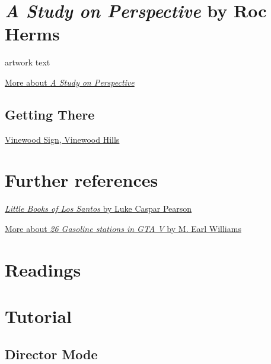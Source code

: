 \documentclass[
  openany]{book}
\begin{document}
\hypertarget{a-study-on-perspective-by-roc-herms}{%
\section*{\texorpdfstring{\emph{A Study on Perspective} by Roc Herms}{A Study on Perspective by Roc Herms}}\label{a-study-on-perspective-by-roc-herms}}

artwork text

\href{https://www.rocherms.com/projects/study-of-perspective/}{More about \emph{A Study on Perspective}}

\hypertarget{getting-there-4}{%
\subsection*{Getting There}\label{getting-there-4}}

\href{https://grandtheftdata.com/landmarks/\#1016.057,312.205,4,atlas,name=vinewood,Vinewood_Sign,_Vinewood_Hills}{Vinewood Sign, Vinewood Hills}

\hypertarget{further-references}{%
\section*{Further references}\label{further-references}}

\href{https://www.alephograph.com/little-books-of-los-santos}{\emph{Little Books of Los Santos} by Luke Caspar Pearson}

\href{https://www.mearlwilliams.com/gasoline_stations\#1}{More about \emph{26 Gasoline stations in GTA V} by M. Earl Williams}

\hypertarget{readings-2}{%
\section*{Readings}\label{readings-2}}

\hypertarget{tutorial-2}{%
\section*{Tutorial}\label{tutorial-2}}

\hypertarget{director-mode}{%
\subsection*{Director Mode}\label{director-mode}}
\end{document}
